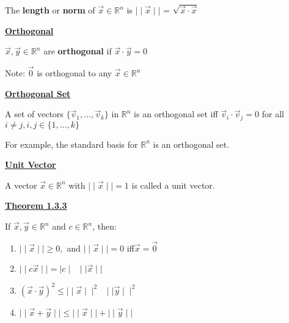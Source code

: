 \documentclass{letter}
\newcommand{\0}[1]{\begin{bmatrix}#1\end{bmatrix}}
\newcommand{\h}[1]{\underline{\textbf{#1}}}
\begin{document}
	The \textbf{length} or \textbf{norm} of $\vec x \in \mathbb{R}^n$ is $\mid \mid \vec x \mid \mid$ = $\sqrt{\vec x \cdot \vec x}$
	
	\h{Orthogonal}
	
	$\vec x, \vec y \in \mathbb{R}^n$ are \textbf{orthogonal} if $\vec x \cdot \vec y = 0$
	
	Note: $\vec 0$ is orthogonal to any $\vec x \in \mathbb{R}^n$
	
	\h{Orthogonal Set}
	
	A set of vectors $\{ \vec v_1, \dots, \vec v_k \}$ in $\mathbb{R}^n$ is an orthogonal set iff $\vec v_i \cdot \vec v_j = 0$ for all $i \neq j, i, j \in \{ 1, \dots, k\} $
	
	For example, the standard basis for $\mathbb{R}^n$ is an orthogonal set.
	
	\h{Unit Vector}
	
	A vector $\vec x \in \mathbb{R}^n$ with $\mid \mid \vec x \mid \mid = 1$ is called a unit vector.
	
	\h{Theorem 1.3.3}
	
	If $\vec x, \vec y \in \mathbb{R}^n$ and $c \in \mathbb{R}^n$, then:
	\begin{enumerate}[1)]
		\item $\mid \mid \vec x \mid \mid \geq 0,$ and $\mid\mid\vec x\mid\mid = 0$ iff$ \vec x = \vec 0$
		\item $\mid\mid c \vec x\mid\mid = \mid c \mid \;\;\mid\mid\vec x\mid\mid$
		\item $(\vec x \cdot \vec y)^2 \leq \mid\mid\vec x\mid\mid^2 \;\;\mid\mid\vec y\mid\mid^2$
		\item $\mid\mid \vec x + \vec y \mid\mid \leq \mid\mid \vec x \mid\mid + \mid\mid \vec y \mid\mid$
	\end{enumerate}
\end{document}
